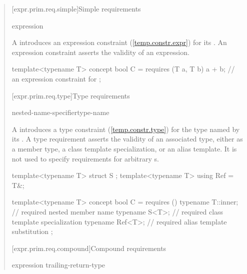 \begin{quote}
[expr.prim.req.simple]{Simple requirements}

\begin{bnf}
\br
    expression \terminal{;}
\end{bnf}

\pnum
A  introduces an expression 
constraint (\ref{temp.constr.expr}) for its 
.
\enternote
An expression constraint asserts the validity of an expression.
\exitnote

\enterexample
\begin{codeblock}
template<typename T> concept bool C =
  requires (T a, T b) {
    a + b;  // an expression constraint for 
  };
\end{codeblock}
\exitexample


[expr.prim.req.type]{Type requirements}

\begin{bnf}
\br
     nested-name-specifier\opt type-name \terminal{;}
\end{bnf}

\pnum
A  introduces a type 
constraint (\ref{temp.constr.type}) for the type named by its
.
%
\enternote
A type requirement asserts the validity of an associated
type, either as a member type, a class template specialization,
or an alias template. It is not used to specify requirements for
arbitrary s.
\exitnote
%
\enterexample
\begin{codeblock}
template<typename T> struct S { };
template<typename T> using Ref = T&;

template<typename T> concept bool C =
  requires () {
    typename T::inner; // required nested member name
    typename S<T>;     // required class template specialization
    typename Ref<T>;   // required alias template substitution
  };
\end{codeblock}
\exitexample


[expr.prim.req.compound]{Compound requirements}
      
\begin{bnf}
\br
  \terminal{\{} expression \terminal{\}} \opt 
    trailing-return-type\opt~\terminal{;}
\end{bnf}


\end{quote}
